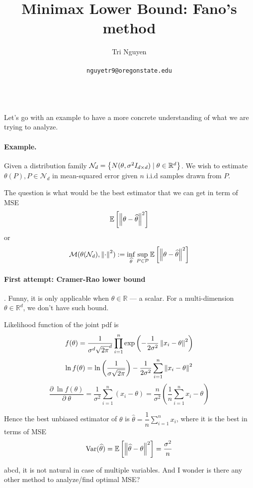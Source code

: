 \documentclass[11pt,a4paper]{article}
\title{Minimax Lower Bound: Fano's method}
\author{	Tri Nguyen \\\\
        \texttt{nguyetr9@oregonstate.edu} \\\\
        }
\begin{document}
\maketitle

Let's go with an example to have a more concrete understanding of what we are trying to analyze.

\paragraph{Example. } Given a distribution family $\mathcal{N}_d = \left\{N(\theta, \sigma^2 I_{d\times d}) \mid \theta \in \mathbb{R}^{d}\right\}$. We wish to estimate $\theta(P), P \in \mathcal{N}_d$ in mean-squared error given $n$ i.i.d samples drawn from $P$.

The question is what would be the best estimator that we can get in term of MSE 
\[
\mathbb{E} \left[\left\lVert\theta- \widehat{\theta}\right\rVert^2\right]
\] 
or
\[
\mathcal{M}(\theta(\mathcal{N}_d), \left\lVert\cdot\right\rVert^2 ) := \inf_{\widehat{\theta}} \sup_{P \in \mathcal{P}} \mathbb{E} \left[\left\lVert \theta - \widehat{\theta}\right\rVert^2 \right]
\] 

\paragraph{First attempt: Cramer-Rao lower bound}. Funny, it is only applicable when $\theta \in \mathbb{R}$ --- a scalar. For a multi-dimension $\theta \in \mathbb{R}^{d}$, we don't have such bound.

Likelihood function of the joint pdf is
\[
f(\theta) = \dfrac{1}{\sigma^{d} \sqrt{2\pi}^{d}} \prod^{n}_{i=1} \text{exp} \left(-\dfrac{1}{2\sigma^2} \left\lVert x_i - \theta\right\rVert^2 \right)
\] 
\[
\ln f(\theta) = \ln \left( \dfrac{1}{\sigma \sqrt{2\pi}} \right) - 
 \dfrac{1}{2\sigma^2}\sum^{n}_{i=1}  \left\lVert x_i - \theta\right\rVert ^2 
\] 
\[
\dfrac{\partial\; \ln f(\theta)}{\partial\; \theta} = \dfrac{1}{\sigma^2} \sum^{n}_{i=1} (x_i - \theta)
= \dfrac{n}{ \sigma^2} \left(\dfrac{1}{n} \sum^{n}_{i=1} x_i - \theta \right)
\] 

Hence the best unbiased estimator of $\theta$ is $\widehat{\theta} = \dfrac{1}{n} \sum^{n}_{i=1} x_i$, where it is the best in terms of MSE
\[
\text{Var}(\widehat{\theta}) = \mathbb{E}\left[\left\lVert\widehat{\theta} - \theta\right\rVert^2\right] = \dfrac{\sigma^2}{n}
\] 

abcd, it is not natural in case of multiple variables. And I wonder is there any other method to analyze/find optimal MSE?
\end{document}

